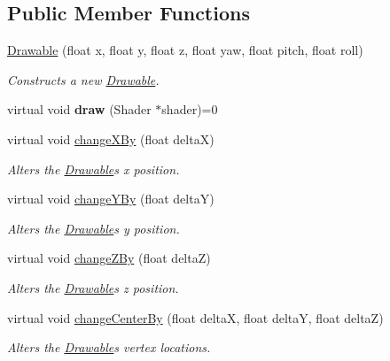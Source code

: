 \subsection*{Public Member Functions}
\begin{DoxyCompactItemize}
\item 
\hyperlink{classtsgl_1_1_drawable_a3a1394a83d01e3036b9eaf67dd5f56e6}{Drawable} (float x, float y, float z, float yaw, float pitch, float roll)
\begin{DoxyCompactList}\small\item\em Constructs a new \hyperlink{classtsgl_1_1_drawable}{Drawable}. \end{DoxyCompactList}\item 
\mbox{\label{classtsgl_1_1_drawable_a0c1fc1a3588438c2884a489bbeba83c5}} 
virtual void {\bfseries draw} (Shader $\ast$shader)=0
\item 
virtual void \hyperlink{classtsgl_1_1_drawable_a5f3c278c5f0fb64ac285ee8326c87987}{change\+X\+By} (float deltaX)
\begin{DoxyCompactList}\small\item\em Alters the \hyperlink{classtsgl_1_1_drawable}{Drawable}\textquotesingle{}s x position. \end{DoxyCompactList}\item 
virtual void \hyperlink{classtsgl_1_1_drawable_a4590b6d35aab302e59e9e7581ecd0997}{change\+Y\+By} (float deltaY)
\begin{DoxyCompactList}\small\item\em Alters the \hyperlink{classtsgl_1_1_drawable}{Drawable}\textquotesingle{}s y position. \end{DoxyCompactList}\item 
virtual void \hyperlink{classtsgl_1_1_drawable_a4497615a4e1e03c40a745fd80c1f51e0}{change\+Z\+By} (float deltaZ)
\begin{DoxyCompactList}\small\item\em Alters the \hyperlink{classtsgl_1_1_drawable}{Drawable}\textquotesingle{}s z position. \end{DoxyCompactList}\item 
virtual void \hyperlink{classtsgl_1_1_drawable_a5e93ed0fd3bd02ec1d77645666bfedb9}{change\+Center\+By} (float deltaX, float deltaY, float deltaZ)
\begin{DoxyCompactList}\small\item\em Alters the \hyperlink{classtsgl_1_1_drawable}{Drawable}\textquotesingle{}s vertex locations. \end{DoxyCompactList}\item 

\end{DoxyCompactItemize}
